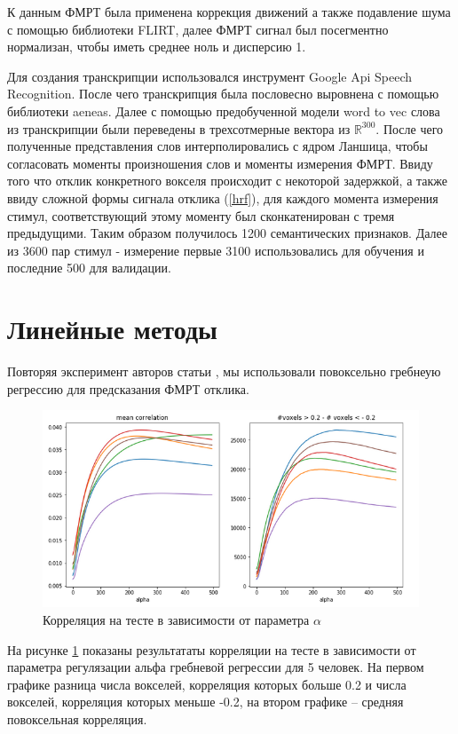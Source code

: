 \documentclass[pdftex,ptm,12pt,a4paper]{report}
\theoremstyle{definition}
\begin{document}
К данным ФМРТ была применена коррекция движений а также подавление шума с помощью библиотеки FLIRT, далее ФМРТ сигнал был посегментно нормализан, чтобы иметь среднее ноль и дисперсию 1. 

Для создания транскрипции использовался инструмент Google Api Speech Recognition. После чего транскрипция была пословесно выровнена с помощью библиотеки aeneas.
Далее с помощью предобученной модели word to vec слова из транскрипции были переведены в трехсотмерные вектора из $\mathbb{R}^{300}.$ После чего полученные представления слов интерполировались с ядром Ланшица, чтобы согласовать моменты произношения слов и моменты измерения ФМРТ. Ввиду того что отклик конкретного вокселя происходит с некоторой задержкой, а также ввиду сложной формы сигнала отклика (\ref{hrf}), для каждого момента измерения стимул, соответствующий этому моменту был сконкатенирован с тремя предыдущими. Таким образом получилось 1200 семантических признаков. Далее из 3600 пар стимул - измерение первые 3100 использовались для обучения и последние 500 для валидации.


\section{Линейные методы}

Повторяя эксперимент авторов статьи \citep{huth2016natural}, мы использовали повоксельно гребнеую регрессию для предсказания ФМРТ отклика.

\begin{figure}[h]
\includegraphics[scale=0.6]{graphics/correlations.png}
\centering
\caption{Корреляция на тесте в зависимости от параметра $\alpha$ }
\label{corr_many}
\end{figure}

На рисунке \ref{corr_many} показаны результататы корреляции на тесте в зависимости от параметра регулязации альфа гребневой регрессии для 5 человек. На первом графике разница числа вокселей, корреляция которых больше 0.2 и числа вокселей, корреляция которых меньше -0.2, на втором графике -- средняя повоксельная корреляция.
\end{document}
